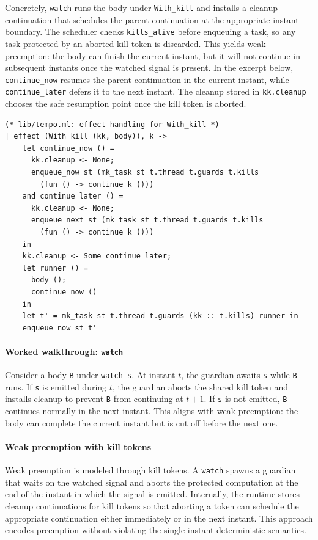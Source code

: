 Concretely, \texttt{watch} runs the body under \texttt{With\_kill} and installs
a cleanup continuation that schedules the parent continuation at the appropriate
instant boundary. The scheduler checks \texttt{kills\_alive} before enqueuing a
task, so any task protected by an aborted kill token is discarded. This yields
weak preemption: the body can finish the current instant, but it will not
continue in subsequent instants once the watched signal is present.
In the excerpt below, \texttt{continue\_now} resumes the parent continuation in
the current instant, while \texttt{continue\_later} defers it to the next
instant. The cleanup stored in \texttt{kk.cleanup} chooses the safe resumption
point once the kill token is aborted.
\begin{lstlisting}[style=tempo]
(* lib/tempo.ml: effect handling for With_kill *)
| effect (With_kill (kk, body)), k ->
    let continue_now () =
      kk.cleanup <- None;
      enqueue_now st (mk_task st t.thread t.guards t.kills
        (fun () -> continue k ()))
    and continue_later () =
      kk.cleanup <- None;
      enqueue_next st (mk_task st t.thread t.guards t.kills
        (fun () -> continue k ()))
    in
    kk.cleanup <- Some continue_later;
    let runner () =
      body ();
      continue_now ()
    in
    let t' = mk_task st t.thread t.guards (kk :: t.kills) runner in
    enqueue_now st t'
\end{lstlisting}

\paragraph{Worked walkthrough: \texttt{watch}}
Consider a body \texttt{B} under \texttt{watch s}. At instant $t$, the guardian
awaits \texttt{s} while \texttt{B} runs. If \texttt{s} is emitted during $t$,
the guardian aborts the shared kill token and installs cleanup to prevent
\texttt{B} from continuing at $t{+}1$. If \texttt{s} is not emitted, \texttt{B}
continues normally in the next instant. This aligns with weak preemption: the
body can complete the current instant but is cut off before the next one.

\paragraph{Weak preemption with kill tokens}
Weak preemption is modeled through kill tokens. A \texttt{watch} spawns a
guardian that waits on the watched signal and aborts the protected computation
at the end of the instant in which the signal is emitted. Internally, the
runtime stores cleanup continuations for kill tokens so that aborting a token
can schedule the appropriate continuation either immediately or in the next
instant. This approach encodes preemption without violating the single-instant
deterministic semantics.

